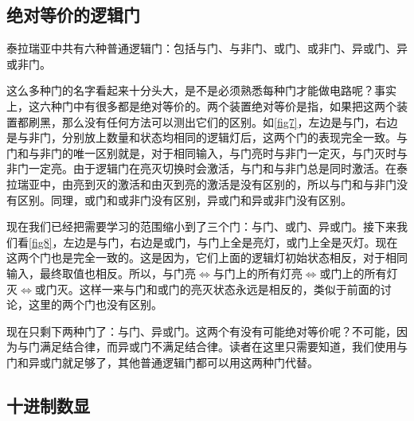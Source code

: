 \subsection{绝对等价的逻辑门}
泰拉瑞亚中共有六种普通逻辑门：包括与门、与非门、或门、或非门、异或门、异或非门。

\begin{figure}[!ht]
\centering
{}
\qquad
{}
\caption{}
\end{figure}

这么多种门的名字看起来十分头大，是不是必须熟悉每种门才能做电路呢？事实上，这六种门中有很多都是绝对等价的。两个装置绝对等价是指，如果把这两个装置都刷黑，那么没有任何方法可以测出它们的区别。如\autoref{fig7}，左边是与门，右边是与非门，分别放上数量和状态均相同的逻辑灯后，这两个门的表现完全一致。与门和与非门的唯一区别就是，对于相同输入，与门亮时与非门一定灭，与门灭时与非门一定亮。由于逻辑门在亮灭切换时会激活，与门和与非门总是同时激活。在泰拉瑞亚中，由亮到灭的激活和由灭到亮的激活是没有区别的，所以与门和与非门没有区别。同理，或门和或非门没有区别，异或门和异或非门没有区别。

现在我们已经把需要学习的范围缩小到了三个门：与门、或门、异或门。接下来我们看\autoref{fig8}，左边是与门，右边是或门，与门上全是亮灯，或门上全是灭灯。现在这两个门也是完全一致的。这是因为，它们上面的逻辑灯初始状态相反，对于相同输入，最终取值也相反。所以，与门亮$\Longleftrightarrow$与门上的所有灯亮$\Longleftrightarrow$或门上的所有灯灭$\Longleftrightarrow$或门灭。这样一来与门和或门的亮灭状态永远是相反的，类似于前面的讨论，这里的两个门也没有区别。

现在只剩下两种门了：与门、异或门。这两个有没有可能绝对等价呢？不可能，因为与门满足结合律，而异或门不满足结合律。读者在这里只需要知道，我们使用与门和异或门就足够了，其他普通逻辑门都可以用这两种门代替。

\subsection{十进制数显}\label{sec2:2}

